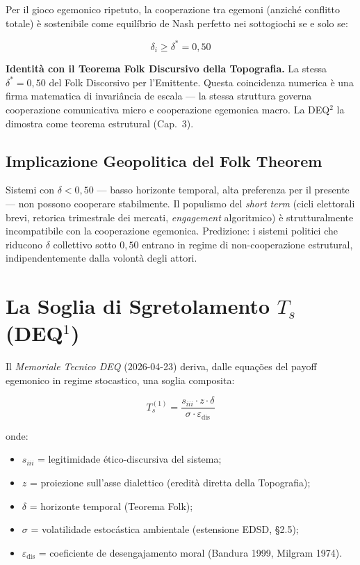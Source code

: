 \Proved{} Per il gioco egemonico ripetuto, la cooperazione tra egemoni
(anziché conflitto totale) è sostenibile come equilíbrio de Nash
perfetto nei sottogiochi se e solo se:

\[
\delta_i \geq \delta^* = 0{,}50
\]

\Hypoth{} \textbf{Identità con il Teorema Folk Discursivo della
Topografia.} La stessa \(\delta^* = 0{,}50\) del Folk Discorsivo per
l'Emittente. Questa coincidenza numerica è una firma matematica di
invariância de escala --- la stessa struttura governa cooperazione
comunicativa micro e cooperazione egemonica macro. La DEQ$^2$ la dimostra
come teorema estrutural (Cap.~3).

\subsection{Implicazione Geopolitica del Folk
Theorem}\label{implicazione-geopolitica-del-folk-theorem}

\Hypoth{} Sistemi con \(\delta < 0{,}50\) --- basso horizonte temporal,
alta preferenza per il presente --- non possono cooperare stabilmente.
Il populismo del \emph{short term} (cicli elettorali brevi, retorica
trimestrale dei mercati, \emph{engagement} algoritmico) è
strutturalmente incompatibile con la cooperazione egemonica. Predizione:
i sistemi politici che riducono \(\delta\) collettivo sotto \(0{,}50\)
entrano in regime di non-cooperazione estrutural, indipendentemente
dalla volontà degli attori.



\section{\texorpdfstring{La Soglia di Sgretolamento \(T_s\)
(DEQ$^1$)}{La Soglia di Sgretolamento T\_s (DEQ$^1$)}}\label{la-soglia-di-sgretolamento-t_s-dequxb9}

Il \emph{Memoriale Tecnico DEQ} (2026-04-23) deriva, dalle equações del
payoff egemonico in regime stocastico, una soglia composita:

\[
T_s^{(1)} = \frac{s_{iii} \cdot z \cdot \delta}{\sigma \cdot \varepsilon_{\text{dis}}}
\]

onde:

\begin{itemize}
\tightlist
\item
  \(s_{iii}\) = legitimidade ético-discursiva del sistema;
\item
  \(z\) = proiezione sull'asse dialettico (eredità diretta della
  Topografia);
\item
  \(\delta\) = horizonte temporal (Teorema Folk);
\item
  \(\sigma\) = volatilidade estocástica ambientale (estensione EDSD, \S{}2.5);
\item
  \(\varepsilon_{\text{dis}}\) = coeficiente de desengajamento moral
  (Bandura 1999, Milgram 1974).
\end{itemize}

